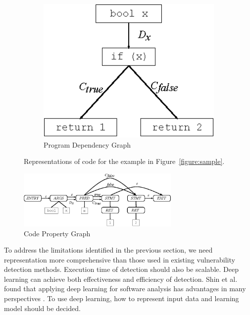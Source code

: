 \begin{figure}[ht]
	\begin{subfigure}[t]{0.33\textwidth}
		\centering
		\includegraphics[width=1\textwidth,height=0.65\textwidth,keepaspectratio]{./figure/pdg.eps}
		\caption{Program Dependency Graph}
		\label{figure:pdg}
	\end{subfigure}
	\caption{Representations of code for the example in Figure~\ref{figure:sample}.}
\end{figure}

\begin{figure}[ht]
	\centering
	\includegraphics[width=0.7\textwidth,height=0.65\textwidth,keepaspectratio]{./figure/cpg.eps}
	\caption{Code Property Graph}
	\label{figure:cpg}
\end{figure}

To address the limitations identified in the previous section, we need representation more comprehensive than those used in existing vulnerability detection methods.
Execution time of detection should also be scalable.
Deep learning can achieve both effectiveness and efficiency of detection.
Shin et al. found that applying deep learning for software analysis has advantages in many perspectives \cite{shin2015recognizing}.
To use deep learning, how to represent input data and learning model should be decided.

